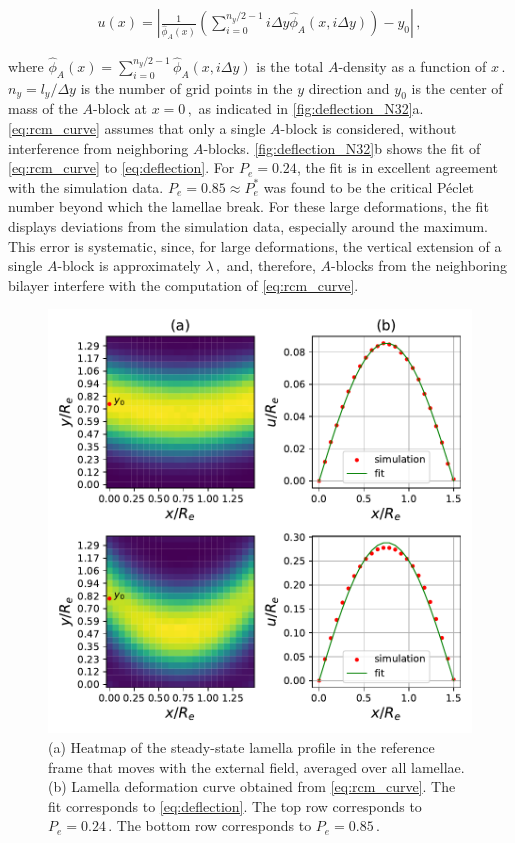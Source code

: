 \documentclass[bachelor,       %
               oneside,        %
               BCOR10mm,       %
               ngerman, english %
               ]{GAUBM}
\begin{document}
\begin{align}
    u(x)=\left |\frac{1}{\hat\phi_A(x)}\left(\sum_{i=0}^{n_y/2-1}i\Delta y \hat\phi_A(x,i\Delta y)\right)-y_0\right |\,,
    \label{eq:rcm_curve}
\end{align}

where $\hat\phi_A(x)=\sum_{i=0}^{n_y/2-1}\hat\phi_A(x,i\Delta y)$ is the total $A$-density as a function of $x\,.$ $n_y=l_y/\Delta y$ is the number of grid points in the $y$ direction and $y_0$ is the center of mass of the $A$-block at $x=0\,,$ as indicated in \autoref{fig:deflection_N32}a. \autoref{eq:rcm_curve} assumes that only a single $A$-block is considered, without interference from neighboring $A$-blocks. \autoref{fig:deflection_N32}b shows the fit of \autoref{eq:rcm_curve} to \autoref{eq:deflection}. For $P_e=0.24$, the fit is in excellent agreement with the simulation data. $P_e=0.85\approx P_e^*$ was found to be the critical P\'eclet number beyond which the lamellae break. For these large deformations, the fit displays deviations from the simulation data, especially around the maximum. This error is systematic, since, for large deformations, the vertical extension of a single $A$-block is approximately $\lambda\,,$ and, therefore, $A$-blocks from the neighboring bilayer interfere with the computation of \autoref{eq:rcm_curve}. 

\begin{figure}[H]
    \centering
    \includegraphics[width=\linewidth]{figures/deflection_N32.pdf}
    \caption{(a) Heatmap of the steady-state lamella profile in the reference frame that moves with the external field, averaged over all lamellae. (b) Lamella deformation curve obtained from \autoref{eq:rcm_curve}. The fit corresponds to \autoref{eq:deflection}. The top row corresponds to $P_e=0.24\,.$ The bottom row corresponds to $P_e=0.85\,.$}
    \label{fig:deflection_N32}
\end{figure}
\end{document}
